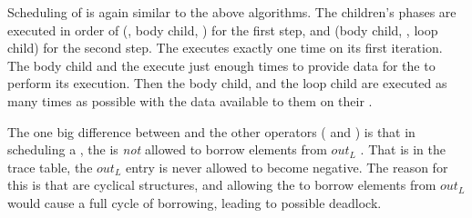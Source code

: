 Scheduling of {\feedbackloops} is again similar to the above
algorithms.  The children's phases are executed in order of
({\splitter}, body child, {\joiner}) for the first step, and (body
child, {\splitter}, loop child) for the second step.  The
{\splitter} executes exactly one time on its first iteration.  The
body child and the {\joiner} execute just enough times to provide
data for the {\splitter} to perform its execution. Then the body
child, {\splitter} and the loop child are executed as many times
as possible with the data available to them on their {\Input}
{\Channels}.

The one big difference between {\feedbackloop} and the other
operators ({\pipeline} and {\splitjoin}) is that in scheduling a
{\feedbackloop}, the {\joiner} is {\emph{not}} allowed to borrow
elements from $out_L$ {\Channel}.  That is in the trace table, the
$out_L$ entry is never allowed to become negative.  The reason for
this is that {\feedbackloops} are cyclical structures, and
allowing the {\joiner} to borrow elements from $out_L$ would cause
a full cycle of borrowing, leading to possible deadlock.


